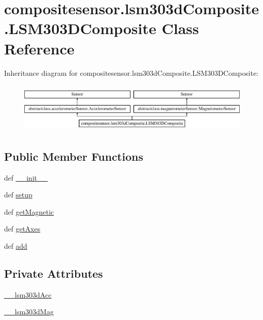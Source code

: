 \hypertarget{classcompositesensor_1_1lsm303dComposite_1_1LSM303DComposite}{}\section{compositesensor.\+lsm303d\+Composite.\+L\+S\+M303\+D\+Composite Class Reference}
\label{classcompositesensor_1_1lsm303dComposite_1_1LSM303DComposite}
Inheritance diagram for compositesensor.\+lsm303d\+Composite.\+L\+S\+M303\+D\+Composite\+:\begin{figure}[H]
\begin{center}
\leavevmode
\includegraphics[height=2.427746cm]{classcompositesensor_1_1lsm303dComposite_1_1LSM303DComposite}
\end{center}
\end{figure}
\subsection*{Public Member Functions}
\begin{DoxyCompactItemize}
\item 
def \hyperlink{classcompositesensor_1_1lsm303dComposite_1_1LSM303DComposite_a6595f380d075da7866a4222194883ce9}{\+\_\+\+\_\+init\+\_\+\+\_\+}
\item 
def \hyperlink{classcompositesensor_1_1lsm303dComposite_1_1LSM303DComposite_ab8312380ba1d46fafbf2c59570c174c8}{setup}
\item 
def \hyperlink{classcompositesensor_1_1lsm303dComposite_1_1LSM303DComposite_a34917aacdc024259696f7c57fbf9d09d}{get\+Magnetic}
\item 
def \hyperlink{classcompositesensor_1_1lsm303dComposite_1_1LSM303DComposite_a514a9d164d8ebacfb22a3cc4f1871970}{get\+Axes}
\item 
def \hyperlink{classcompositesensor_1_1lsm303dComposite_1_1LSM303DComposite_aa4cf28e6d065473605af1ab7f1e69937}{add}
\end{DoxyCompactItemize}
\subsection*{Private Attributes}
\begin{DoxyCompactItemize}
\item 
\hyperlink{classcompositesensor_1_1lsm303dComposite_1_1LSM303DComposite_a0ebfdf83005bd6facd42c7fd818cc9bc}{\+\_\+\+\_\+lsm303d\+Acc}
\item 
\hyperlink{classcompositesensor_1_1lsm303dComposite_1_1LSM303DComposite_a02f21c802c80523cf3726c6ab329ddc8}{\+\_\+\+\_\+lsm303d\+Mag}
\end{DoxyCompactItemize}
